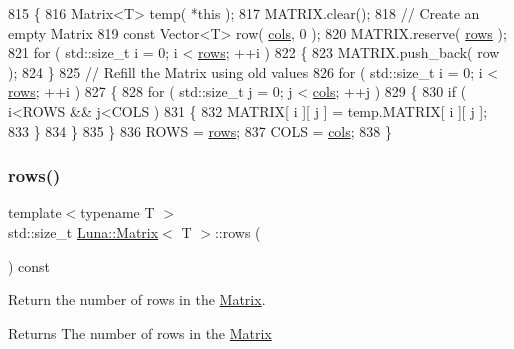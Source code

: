 \begin{DoxyCode}
815   \{
816     Matrix<T> temp( *\textcolor{keyword}{this} );
817     MATRIX.clear();
818     \textcolor{comment}{// Create an empty Matrix}
819     \textcolor{keyword}{const} Vector<T> row( \hyperlink{classLuna_1_1Matrix_aa7472f90f4c470535e722f3a389a19b1}{cols}, 0 );
820     MATRIX.reserve( \hyperlink{classLuna_1_1Matrix_ae7b0b30c3e22ba252d660f093757295e}{rows} );
821     \textcolor{keywordflow}{for} ( std::size\_t i = 0; i < \hyperlink{classLuna_1_1Matrix_ae7b0b30c3e22ba252d660f093757295e}{rows}; ++i )
822     \{
823       MATRIX.push\_back( row );
824     \}
825     \textcolor{comment}{// Refill the Matrix using old values}
826     \textcolor{keywordflow}{for} ( std::size\_t i = 0; i < \hyperlink{classLuna_1_1Matrix_ae7b0b30c3e22ba252d660f093757295e}{rows}; ++i )
827     \{
828       \textcolor{keywordflow}{for} ( std::size\_t j = 0; j < \hyperlink{classLuna_1_1Matrix_aa7472f90f4c470535e722f3a389a19b1}{cols}; ++j )
829       \{
830         \textcolor{keywordflow}{if} ( i<ROWS && j<COLS )
831         \{
832           MATRIX[ i ][ j ] = temp.MATRIX[ i ][ j ];
833         \}
834       \}
835     \}
836     ROWS = \hyperlink{classLuna_1_1Matrix_ae7b0b30c3e22ba252d660f093757295e}{rows};
837     COLS = \hyperlink{classLuna_1_1Matrix_aa7472f90f4c470535e722f3a389a19b1}{cols};
838   \}
\end{DoxyCode}
\mbox{\label{classLuna_1_1Matrix_ae7b0b30c3e22ba252d660f093757295e}} 
\subsubsection{\texorpdfstring{rows()}{rows()}}
{\footnotesize\ttfamily template$<$typename T $>$ \\
std\+::size\+\_\+t \hyperlink{classLuna_1_1Matrix}{Luna\+::\+Matrix}$<$ T $>$\+::rows (\begin{DoxyParamCaption}{ }\end{DoxyParamCaption}) const\hspace{0.3cm}{\ttfamily [inline]}}



Return the number of rows in the \hyperlink{classLuna_1_1Matrix}{Matrix}. 

\begin{DoxyReturn}{Returns}
The number of rows in the \hyperlink{classLuna_1_1Matrix}{Matrix} 
\end{DoxyReturn}



